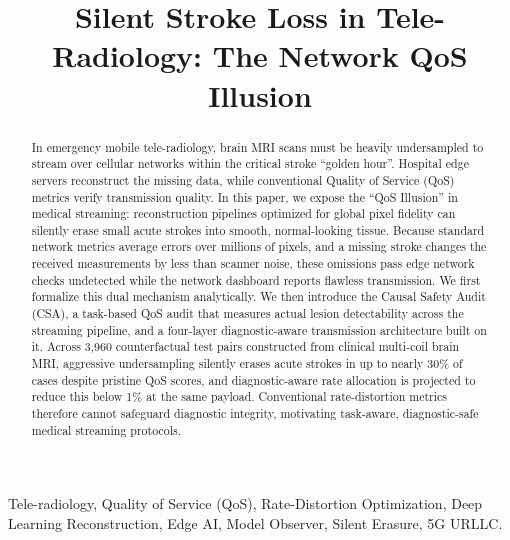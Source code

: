 \documentclass[conference]{IEEEtran}
\begin{document}
\title{Silent Stroke Loss in Tele-Radiology: The Network QoS Illusion}

\author{
}

\maketitle

\begin{abstract}
In emergency mobile tele-radiology, brain MRI scans must be heavily undersampled to stream over cellular networks within the critical stroke ``golden hour''. Hospital edge servers reconstruct the missing data, while conventional Quality of Service (QoS) metrics verify transmission quality. In this paper, we expose the ``QoS Illusion'' in medical streaming: reconstruction pipelines optimized for global pixel fidelity can silently erase small acute strokes into smooth, normal-looking tissue. Because standard network metrics average errors over millions of pixels, and a missing stroke changes the received measurements by less than scanner noise, these omissions pass edge network checks undetected while the network dashboard reports flawless transmission. We first formalize this dual mechanism analytically. We then introduce the Causal Safety Audit (CSA), a task-based QoS audit that measures actual lesion detectability across the streaming pipeline, and a four-layer diagnostic-aware transmission architecture built on it. Across 3,960 counterfactual test pairs constructed from clinical multi-coil brain MRI, aggressive undersampling silently erases acute strokes in up to nearly 30\% of cases despite pristine QoS scores, and diagnostic-aware rate allocation is projected to reduce this below 1\% at the same payload. Conventional rate-distortion metrics therefore cannot safeguard diagnostic integrity, motivating task-aware, diagnostic-safe medical streaming protocols.
\end{abstract}

\begin{IEEEkeywords}
Tele-radiology, Quality of Service (QoS), Rate-Distortion Optimization, Deep Learning Reconstruction, Edge AI, Model Observer, Silent Erasure, 5G URLLC.
\end{IEEEkeywords}
\end{document}

